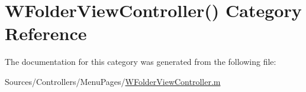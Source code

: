 \hypertarget{category_w_folder_view_controller_07_08}{\section{W\-Folder\-View\-Controller() Category Reference}
\label{category_w_folder_view_controller_07_08}
}


The documentation for this category was generated from the following file\-:\begin{DoxyCompactItemize}
\item 
Sources/\-Controllers/\-Menu\-Pages/\hyperlink{_w_folder_view_controller_8m}{W\-Folder\-View\-Controller.\-m}\end{DoxyCompactItemize}
